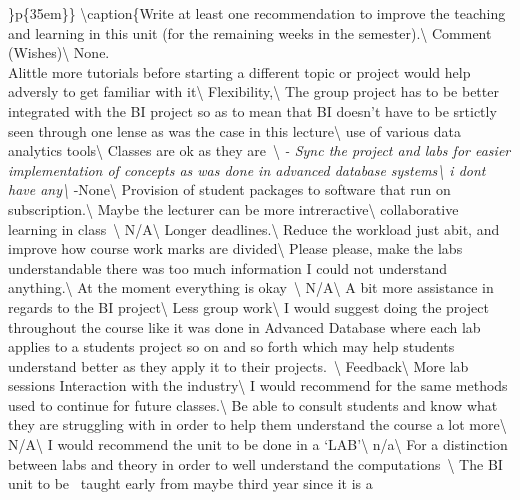 \documentclass[
]{article}
\begin{document}
\arraybackslash\}p\{35em\}\}
\textbackslash caption\{\label{tab:RawWishesData}Write at least one
recommendation to improve the teaching and learning in this unit (for
the remaining weeks in the semester).\textbackslash{} \toprule Comment
(Wishes)\textbackslash{} \midrule None.\\
\hline Alittle more tutorials before starting a different topic or
project would help adversly to get familiar with it\textbackslash{}
\hline Flexibility,\textbackslash{} \hline The group project has to be
better integrated with the BI project so as to mean that BI doesn't have
to be srtictly seen through one lense as was the case in this
lecture\textbackslash{} \hline use of various data analytics
tools\textbackslash{} \hline Classes are ok as they are~\textbackslash{}
\hline \emph{- Sync the project and labs for easier implementation of
concepts as was done in advanced database systems\textbackslash{} \hline
i dont have any\textbackslash{} \hline }-None\textbackslash{} \hline
Provision of student packages to software that run on
subscription.\textbackslash{} \hline Maybe the lecturer can be more
intreractive\textbackslash{} \hline collaborative learning in
class~\textbackslash{} \hline N/A\textbackslash{} \hline Longer
deadlines.\textbackslash{} \hline Reduce the workload just abit, and
improve how course work marks are divided\textbackslash{} \hline Please
please, make the labs understandable there was too much information I
could not understand anything.\textbackslash{} \hline At the moment
everything is okay~\textbackslash{} \hline N/A\textbackslash{} \hline A
bit more assistance in regards to the BI project\textbackslash{} \hline
Less group work\textbackslash{} \hline I would suggest doing the project
throughout the course like it was done in Advanced Database where each
lab applies to a students project so on and so forth which may help
students understand better as they apply it to their
projects.~\textbackslash{} \hline Feedback\textbackslash{} \hline More
lab sessions Interaction with the industry\textbackslash{} \hline I
would recommend for the same methods used to continue for future
classes.\textbackslash{} \hline Be able to consult students and know
what they are struggling with in order to help them understand the
course a lot more\textbackslash{} \hline N/A\textbackslash{} \hline I
would recommend the unit to be done in a `LAB'\textbackslash{} \hline
n/a\textbackslash{} \hline For a distinction between labs and theory in
order to well understand the computations~\textbackslash{} \hline The BI
unit to be~ taught early from maybe third year since it is a
\end{document}
